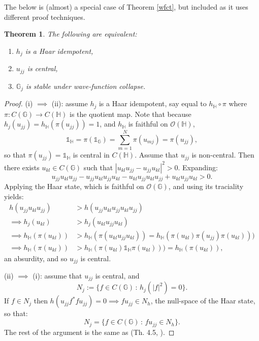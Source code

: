 \documentclass[12pt]{amsart}
\newtheorem{theorem}{Theorem}[section]
\theoremstyle{remark}
\theoremstyle{remark}
\begin{document}
The below is (almost) a special case of Theorem \ref{wfct}, but included as it uses different proof techniques.
\begin{theorem}
The following are equivalent:
\begin{enumerate}
  \item[(i)] $h_j$ is a Haar idempotent,
  \item[(ii)] $u_{jj}$ is central,
  \item[(iii)] $\mathbb{G}_j$ is stable under wave-function collapse.
\end{enumerate}
\end{theorem}

\begin{proof}
(i) $\implies$ (ii): assume $h_j$ is a Haar idempotent, say equal to $h_{\mathbb{H}}\circ \pi$ where $\pi:C(\mathbb{G})\to C(\mathbb{H})$ is the quotient map. Note that because $h_j(u_{jj})=h_{\mathbb{H}}(\pi(u_{jj}))=1$, and $h_{\mathbb{H}}$ is faithful on $\mathcal{O}(\mathbb{H})$,
$$\mathds{1}_{\mathbb{H}}=\pi(\mathds{1}_{\mathbb{G}})=\sum_{m=1}^N \pi(u_{mj})=\pi(u_{jj}),$$
so that $\pi(u_{jj})=\mathds{1}_{\mathds{H}}$ is central in $C(\mathbb{H})$. Assume that $u_{jj}$ is non-central. Then there exists $u_{kl}\in C(\mathbb{G})$ such that $|u_{kl}u_{jj}-u_{jj}u_{kl}|^2>0$. Expanding:
$$u_{jj}u_{kl}u_{jj}-u_{jj}u_{kl}u_{jj}u_{kl}-u_{kl}u_{jj}u_{kl}u_{jj}+u_{kl}u_{jj}u_{kl}>0.$$
Applying the Haar state, which is faithful on $\mathcal{O}(\mathbb{G})$, and using its traciality yields:
\begin{align*}
  h(u_{jj}u_{kl}u_{jj})&>h(u_{jj}u_{kl}u_{jj}u_{kl}u_{jj})  \\
  \implies h_j(u_{kl}) & >h_j(u_{kl}u_{jj}u_{kl}) \\
  \implies h_{\mathbb{H}}(\pi(u_{kl})) & >h_{\mathbb{H}}(\pi(u_{kl}u_{jj}u_{kl}))=h_{\mathbb{H}}(\pi(u_{kl})\pi(u_{jj})\pi(u_{kl})))
  \\ \implies h_{\mathbb{H}}(\pi(u_{kl}))&>h_{\mathbb{H}}(\pi(u_{kl})\mathds{1}_{\mathds{H}}\pi(u_{kl})))=h_{\mathbb{H}}(\pi(u_{kl})),
\end{align*}
an absurdity, and so $u_{jj}$ is central.

\bigskip

(ii) $\implies$ (i): assume that $u_{jj}$ is central, and
$$N_j:=\{f\in C(\mathbb{G})\,\colon\,h_j(|f|^2)=0\}.$$
If $f\in N_j$ then $h(u_{jj}f^*fu_{jj})=0\implies fu_{jj}\in N_h$, the null-space of the Haar state, so that:
$$N_j=\{f\in C(\mathbb{G})\,\colon\, fu_{jj}\in N_h\}.$$
The rest of the argument is the same as (Th. 4.5, \cite{frs}).


\end{proof}
\end{document}
